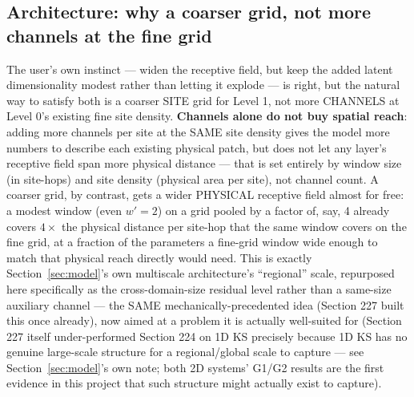 \documentclass[11pt]{article}
\begin{document}
\subsection{Architecture: why a coarser grid, not more channels at the fine grid}
\label{sec:residual_architecture}

The user's own instinct --- widen the receptive field, but keep the
added latent dimensionality modest rather than letting it explode --- is
right, but the natural way to satisfy both is a coarser SITE grid for
Level 1, not more CHANNELS at Level 0's existing fine site density.
\textbf{Channels alone do not buy spatial reach}: adding more channels
per site at the SAME site density gives the model more numbers to
describe each existing physical patch, but does not let any layer's
receptive field span more physical distance --- that is set entirely by
window size (in site-hops) and site density (physical area per site),
not channel count. A coarser grid, by contrast, gets a wider PHYSICAL
receptive field almost for free: a modest window (even $w'=2$) on a
grid pooled by a factor of, say, 4 already covers $4\times$ the physical
distance per site-hop that the same window covers on the fine grid, at
a fraction of the parameters a fine-grid window wide enough to match
that physical reach directly would need. This is exactly
Section~\ref{sec:model}'s own multiscale architecture's ``regional''
scale, repurposed here specifically as the cross-domain-size residual
level rather than a same-size auxiliary channel --- the SAME
mechanically-precedented idea (Section 227 built this once already),
now aimed at a problem it is actually well-suited for (Section
227 itself under-performed Section 224 on 1D KS precisely because 1D KS
has no genuine large-scale structure for a regional/global scale to
capture --- see Section~\ref{sec:model}'s own note; both 2D systems'
G1/G2 results are the first evidence in this project that such structure
might actually exist to capture).
\end{document}
